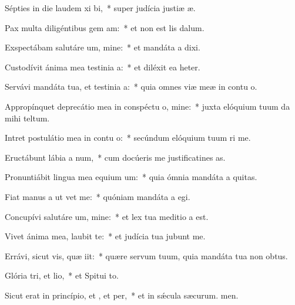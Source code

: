 \item Sépties in die laudem xi bi,~* super judícia justiæ æ.
\item Pax multa diligéntibus gem am:~* et non est lis dalum.
\item Exspectábam salutáre um, mine:~* et mandáta a dixi.
\item Custodívit ánima mea testinia a:~* et diléxit ea heter.
\item Servávi mandáta tua, et testinia a:~* quia omnes viæ meæ in contu o.
\item Appropínquet deprecátio mea in conspéctu o, mine:~* juxta elóquium tuum da mihi teltum.
\item Intret postulátio mea in contu o:~* secúndum elóquium tuum ri me.
\item Eructábunt lábia a num,~* cum docúeris me justificatines as.
\item Pronuntiábit lingua mea equium um:~* quia ómnia mandáta a quitas.
\item Fiat manus a ut vet me:~* quóniam mandáta a egi.
\item Concupívi salutáre um, mine:~* et lex tua meditio a est.
\item Vivet ánima mea,  laubit te:~* et judícia tua jubunt me.
\item Errávi, sicut vis, quæ iit:~* quære servum tuum, quia mandáta tua non  obtus.
\item Glória tri, et lio,~* et Spitui to.
\item Sicut erat in princípio, et , et per,~* et in sǽcula sæcurum. men.
